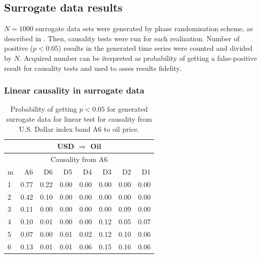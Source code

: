 \subsection{Surrogate data results}

$N=1000$ surrogate data sets were generated by phase randomisation scheme, as described in .
Then, causality tests were run for each realization.
Number of positive ($p < 0.05$) results in the generated time series were counted and divided by $N$.
Acquired number can be iterpreted as probability of getting a false-positive result for causality tests and used to asses results fidelity.

\subsubsection{Linear causality in surrogate data}

%
%
\begin{table}[H]
\begin{center}
\begin{tabular}{l|r r r r r r r}
\hline\hline
\multicolumn{8}{c}{USD $\Rightarrow$ Oil}\\
\hline
\multicolumn{8}{c}{Causality from A6}\\
\hline\hline
m & A6 & D6 & D5 & D4 & D3 & D2 & D1 \\
\hline
1 & 0.77 & 0.22 & 0.00 & 0.00 & 0.00 & 0.00 & 0.00 \\
2 & 0.42 & 0.10 & 0.00 & 0.00 & 0.00 & 0.00 & 0.00 \\
3 & 0.11 & 0.00 & 0.00 & 0.00 & 0.00 & 0.09 & 0.00 \\
4 & 0.10 & 0.01 & 0.00 & 0.00 & 0.12 & 0.05 & 0.07 \\
5 & 0.07 & 0.00 & 0.01 & 0.02 & 0.12 & 0.10 & 0.06 \\
6 & 0.13 & 0.01 & 0.01 & 0.06 & 0.15 & 0.16 & 0.06 \\
\hline\hline
\end{tabular}
\caption{Probability of getting $p < 0.05$ for generated surrogate data for linear test for causality from U.S. Dollar index band A6 to oil price.}
\end{center}
\end{table}

